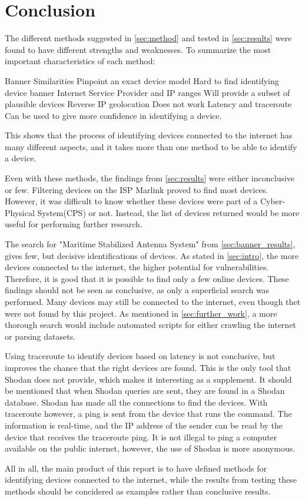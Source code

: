 \section{Conclusion} \label{sec:conclusion}
The different methods suggested in \cref{sec:method} and tested in \cref{sec:results} were found to have different strengths and weaknesses. To summarize the most important characteristics of each method:

\begin{outline}[itemize]
    \setlength\itemsep{10em}
        \1 Banner Similarities
        \2 Pinpoint an exact device model
        \2 Hard to find identifying device banner
        \1 Internet Service Provider and IP ranges
        \2 Will provide a subset of plausible devices
        \1 Reverse IP geolocation
        \2 Does not work
        \1 Latency and traceroute
        \2 Can be used to give more confidence in identifying a device.

\end{outline}

This shows that the process of identifying devices connected to the internet has many different aspects, and it takes more than one method to be able to identify a device.

Even with these methods, the findings from \cref{sec:results} were either inconclusive or few. Filtering devices on the ISP Marlink proved to find most devices. However, it was difficult to know whether these devices were part of a Cyber-Physical System(CPS) or not. Instead, the list of devices returned would be more useful for performing further research. 

The search for "Maritime Stabilized Antenna System" from \cref{sec:banner_results}, gives few, but decisive identifications of devices. As stated in \cref{sec:intro}, the more devices connected to the internet, the higher potential for vulnerabilities. Therefore, it is good that it is possible to find only a few online devices. These findings should not be seen as conclusive, as only a superficial search was performed. Many devices may still be connected to the internet, even though thet were not found by this project. As mentioned in \cref{sec:further_work}, a more thorough search would include automated scripts for either crawling the internet or parsing datasets. 

Using traceroute to identify devices based on latency is not conclusive, but improves the chance that the right devices are found. This is the only tool that Shodan does not provide, which makes it interesting as a supplement. It should be mentioned that when Shodan queries are sent, they are found in a Shodan database. Shodan has made all the connections to find the devices. With traceroute however, a ping is sent from the device that runs the command. The information is real-time, and the IP address of the sender can be read by the device that receives the traceroute ping. It is not illegal to ping a computer available on the public internet, however, the use of Shodan is more anonymous. 

All in all, the main product of this report is to have defined methods for identifying devices connected to the internet, while the results from testing these methods should be concidered as examples rather than conclusive results. 
